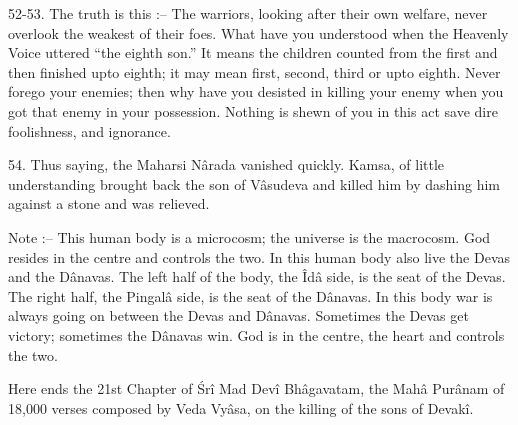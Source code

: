 52-53. The truth is this :-- The warriors, looking after their own welfare, never overlook the weakest of their foes. What have you understood when the Heavenly Voice uttered ``the eighth son.'' It means the children counted from the first and then finished upto eighth; it may mean first, second, third or upto eighth. Never forego your enemies; then why have you desisted in killing your enemy when you got that enemy in your possession. Nothing is shewn of you in this act save dire foolishness, and ignorance.

54. Thus saying, the Maharsi N\^arada vanished quickly. Kamsa, of little understanding brought back the son of V\^asudeva and killed him by dashing him against a stone and was relieved.

Note :-- This human body is a microcosm; the universe is the macrocosm. God resides in the centre and controls the two. In this human body also live the Devas and the D\^anavas. The left half of the body, the Îd\^a side, is the seat of the Devas. The right half, the Pingal\^a side, is the seat of the D\^anavas. In this body war is always going on between the Devas and D\^anavas. Sometimes the Devas get victory; sometimes the D\^anavas win. God is in the centre, the heart and controls the two.

Here ends the 21st Chapter of \'Sr\^i Mad Dev\^i Bh\^agavatam, the Mah\^a Pur\^anam of 18,000 verses composed by Veda Vy\^asa, on the killing of the sons of Devak\^i.